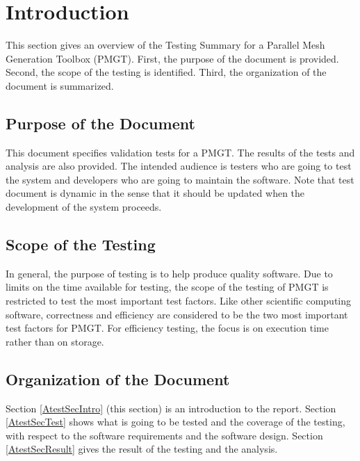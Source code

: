 \documentclass[12pt,titlepage]{article}
\begin{document}
 \label{mMemory}
 \label{mFileRW}
 \label{mKeyboard}
 \label{mScreen}
 \label{mInput}
 \label{mOutput}
 \label{mService}
 \label{mVertex}
 \label{mEdge}
 \label{mCell}
 \label{mMesh}
 \label{mRefining}
 \label{mCoarsening}

\newpage

\section{Introduction \label{AtestSecIntro}}
This section gives an overview of the Testing Summary for a Parallel Mesh Generation Toolbox (PMGT). First, the purpose of the document is provided. Second, the scope of the testing is identified. Third, the organization of the document is summarized.

\subsection{Purpose of the Document}
This document specifies validation tests for a PMGT. The results of the tests and analysis are also provided. The intended audience is testers who are going to test the system and developers who are going to maintain the software. Note that test document is dynamic in the sense that it should be updated when the development of the system proceeds. 

\subsection{Scope of the Testing }
In general, the purpose of testing is to help produce quality software. Due to limits on the time available for testing, the scope of the testing of PMGT is restricted to test the most important test factors. Like other scientific computing software, correctness and efficiency are considered to be the two most important test factors for PMGT. For efficiency testing, the focus is on execution time rather than on storage. 

\subsection{Organization of the Document}
Section \ref{AtestSecIntro} (this section) is an introduction to the report. Section \ref{AtestSecTest} shows what is going to be tested and the coverage of the testing, with respect to the software requirements and the software design. Section \ref{AtestSecResult} gives the result of the testing and the analysis. 
\end{document}
